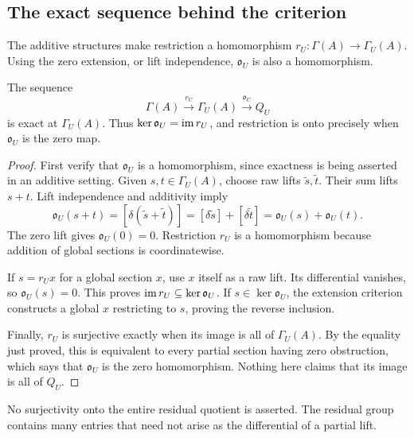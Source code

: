 \subsection{The exact sequence behind the criterion}
The additive structures make restriction a homomorphism
\(r_U:\Gamma(A)\to\Gamma_U(A)\). Using the zero extension, or lift independence, \(\mathfrak o_U\) is also a homomorphism.

\begin{KSproposition}\label{KS:KS12}
The sequence
\[
 \Gamma(A)\xrightarrow{r_U}\Gamma_U(A)
 \xrightarrow{\mathfrak o_U}Q_U
\]
is exact at \(\Gamma_U(A)\). Thus \(\ker\mathfrak o_U=\operatorname{im} r_U\), and restriction is onto precisely when \(\mathfrak o_U\) is the zero map.
\end{KSproposition}
\begin{proof}
First verify that $\mathfrak o_U$ is a homomorphism, since exactness is being asserted in an additive setting. Given $s,t\in\Gamma_U(A)$, choose raw lifts $\widetilde s,\widetilde t$. Their sum lifts $s+t$. Lift independence and additivity imply
\[
 \mathfrak o_U(s+t)
 =[\delta(\widetilde s+\widetilde t)]
 =[\delta\widetilde s]+[\delta\widetilde t]
 =\mathfrak o_U(s)+\mathfrak o_U(t).
\]
The zero lift gives $\mathfrak o_U(0)=0$. Restriction $r_U$ is a homomorphism because addition of global sections is coordinatewise.

If $s=r_Ux$ for a global section $x$, use $x$ itself as a raw lift. Its differential vanishes, so $\mathfrak o_U(s)=0$. This proves $\operatorname{im} r_U\subseteq\ker\mathfrak o_U$. If $s\in\ker\mathfrak o_U$, the extension criterion constructs a global $x$ restricting to $s$, proving the reverse inclusion.

Finally, $r_U$ is surjective exactly when its image is all of $\Gamma_U(A)$. By the equality just proved, this is equivalent to every partial section having zero obstruction, which says that $\mathfrak o_U$ is the zero homomorphism. Nothing here claims that its image is all of $Q_U$.
\end{proof}
No surjectivity onto the entire residual quotient is asserted. The residual group contains many entries that need not arise as the differential of a partial lift.

